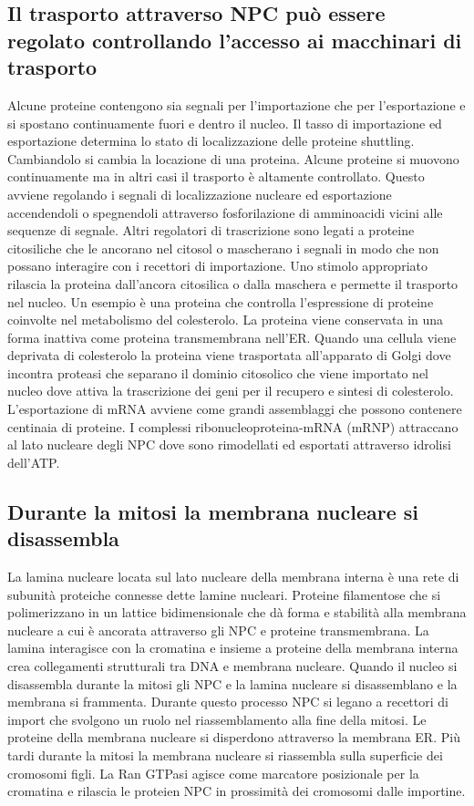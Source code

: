 \subsection{Il trasporto attraverso NPC pu\`o essere regolato controllando l'accesso ai macchinari di trasporto}
Alcune proteine contengono sia segnali per l'importazione che per l'esportazione e si spostano continuamente fuori e dentro il nucleo. Il tasso di importazione ed esportazione determina
lo stato di localizzazione delle proteine shuttling. Cambiandolo si cambia la locazione di una proteina. Alcune proteine si muovono continuamente ma in altri casi il trasporto \`e
altamente controllato. Questo avviene regolando i segnali di localizzazione nucleare ed esportazione accendendoli o spegnendoli attraverso fosforilazione di amminoacidi vicini alle
sequenze di segnale. Altri regolatori di trascrizione sono legati a proteine citosiliche che le ancorano nel citosol o mascherano i segnali in modo che non possano interagire con i 
recettori di importazione. Uno stimolo appropriato rilascia la proteina dall'ancora citosilica o dalla maschera e permette il trasporto nel nucleo. Un esempio \`e una proteina che 
controlla l'espressione di proteine coinvolte nel metabolismo del colesterolo. La proteina viene conservata in una forma inattiva come proteina transmembrana nell'ER. Quando una 
cellula viene deprivata di colesterolo la proteina viene trasportata all'apparato di Golgi dove incontra proteasi che separano il dominio citosolico che viene importato nel nucleo dove
attiva la trascrizione dei geni per il recupero e sintesi di colesterolo. L'esportazione di mRNA avviene come grandi assemblaggi che possono contenere centinaia di proteine. I 
complessi ribonucleoproteina-mRNA (mRNP) attraccano al lato nucleare degli NPC dove sono rimodellati ed esportati attraverso idrolisi dell'ATP. 
\subsection{Durante la mitosi la membrana nucleare si disassembla}
La lamina nucleare locata sul lato nucleare della membrana interna \`e una rete di subunit\`a proteiche connesse dette lamine nucleari. Proteine filamentose che si polimerizzano in
un lattice bidimensionale che d\`a forma e stabilit\`a alla membrana nucleare a cui \`e ancorata attraverso gli NPC e proteine transmembrana. La lamina interagisce con la cromatina e
insieme a proteine della membrana interna crea collegamenti strutturali tra DNA e membrana nucleare. Quando il nucleo si disassembla durante la mitosi gli NPC e la lamina nucleare si 
disassemblano e la membrana si frammenta. Durante questo processo NPC si legano a recettori di import che svolgono un ruolo nel riassemblamento alla fine della mitosi. Le proteine della
membrana nucleare si disperdono attraverso la membrana ER. Pi\`u tardi durante la mitosi la membrana nucleare si riassembla sulla superficie dei cromosomi figli. La Ran GTPasi 
agisce come marcatore posizionale per la cromatina e rilascia le proteien NPC in prossimit\`a dei cromosomi dalle importine. 
